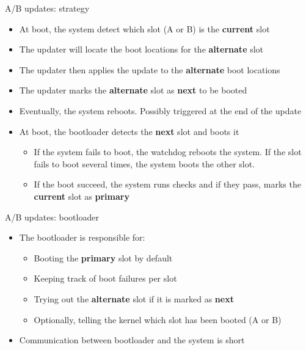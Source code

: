 \begin{frame}{A/B updates: strategy}
  \begin{itemize}
    \item At boot, the system detect which slot (A or B) is the \textbf{current} slot
    \item The updater will locate the boot locations for the \textbf{alternate} slot
    \item The updater then applies the update to the \textbf{alternate} boot locations
    \item The updater marks the \textbf{alternate} slot as \textbf{next} to be booted
    \item Eventually, the system reboots. Possibly triggered at the end of the update
    \item At boot, the bootloader detects the \textbf{next} slot and boots it
    \begin{itemize}
      \item If the system fails to boot, the watchdog reboots the system. If the slot
            fails to boot several times, the system boots the other slot.
      \item If the boot succeed, the system runs checks and if they pass, marks the
            \textbf{current} slot as \textbf{primary}
    \end{itemize}
  \end{itemize}
\end{frame}

\begin{frame}{A/B updates: bootloader}
  \begin{itemize}
    \item The bootloader is responsible for:
    \begin{itemize}
      \item Booting the \textbf{primary} slot by default
      \item Keeping track of boot failures per slot
      \item Trying out the \textbf{alternate} slot if it is marked as \textbf{next}
      \item Optionally, telling the kernel which slot has been booted (A or B)
    \end{itemize}
    \item Communication between bootloader and the system is short
  \end{itemize}
\end{frame}


